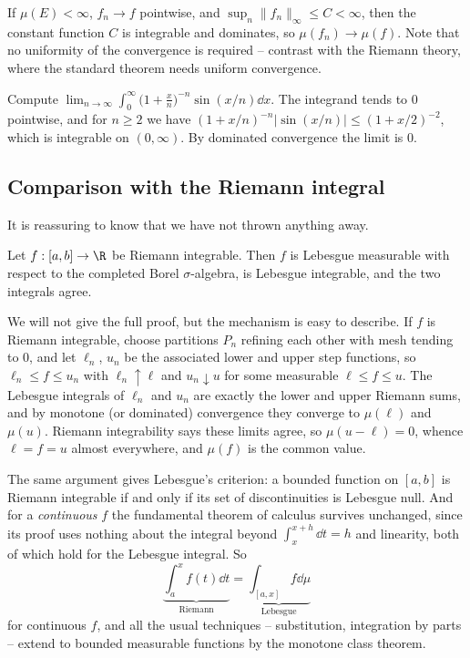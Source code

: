 \begin{example}
	If $\mu(E) < \infty$, $f_n \to f$ pointwise, and $\sup_n\|f_n\|_\infty \leq C < \infty$, then the constant function $C$ is integrable and dominates, so $\mu(f_n)\to\mu(f)$. Note that no uniformity of the convergence is required -- contrast with the Riemann theory, where the standard theorem needs uniform convergence.
\end{example}

\begin{example}
	Compute $\lim_{n\to\infty}\int_0^\infty \big(1+\tfrac{x}{n}\big)^{-n}\sin(x/n)\dd x$. The integrand tends to $0$ pointwise, and for $n \geq 2$ we have $(1+x/n)^{-n}|\sin(x/n)| \leq (1+x/2)^{-2}$, which is integrable on $(0,\infty)$. By dominated convergence the limit is $0$.
\end{example}

\subsection{Comparison with the Riemann integral}

It is reassuring to know that we have not thrown anything away.

\begin{theorem}\label{thm:riemann}
	Let $f : [a,b]\to\R$ be Riemann integrable. Then $f$ is Lebesgue measurable with respect to the completed Borel $\sigma$-algebra, is Lebesgue integrable, and the two integrals agree.
\end{theorem}

We will not give the full proof, but the mechanism is easy to describe. If $f$ is Riemann integrable, choose partitions $P_n$ refining each other with mesh tending to $0$, and let $\ell_n$, $u_n$ be the associated lower and upper step functions, so $\ell_n \leq f \leq u_n$ with $\ell_n \uparrow \ell$ and $u_n \downarrow u$ for some measurable $\ell \leq f \leq u$. The Lebesgue integrals of $\ell_n$ and $u_n$ are exactly the lower and upper Riemann sums, and by monotone (or dominated) convergence they converge to $\mu(\ell)$ and $\mu(u)$. Riemann integrability says these limits agree, so $\mu(u - \ell) = 0$, whence $\ell = f = u$ almost everywhere, and $\mu(f)$ is the common value.

\begin{remark}
	The same argument gives Lebesgue's criterion: a bounded function on $[a,b]$ is Riemann integrable if and only if its set of discontinuities is Lebesgue null. And for a \emph{continuous} $f$ the fundamental theorem of calculus survives unchanged, since its proof uses nothing about the integral beyond $\int_x^{x+h}\dd t = h$ and linearity, both of which hold for the Lebesgue integral. So
	$$
	\underbrace{\int_a^x f(t)\dd t}_{\text{Riemann}} = \underbrace{\int_{[a,x]} f \dd\mu}_{\text{Lebesgue}}
	$$
	for continuous $f$, and all the usual techniques -- substitution, integration by parts -- extend to bounded measurable functions by the monotone class theorem.
\end{remark}

